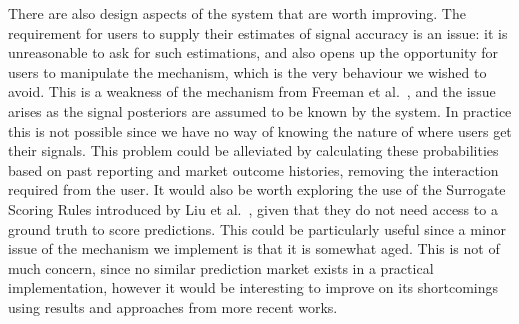 There are also design aspects of the system that are worth improving. The
requirement for users to supply their estimates of signal accuracy is an issue:
it is unreasonable to ask for such estimations, and also opens up the
opportunity for users to manipulate the mechanism, which is the very behaviour
we wished to avoid. This is a weakness of the mechanism from Freeman et
al.~\cite{CODiPM}, and the issue arises as the signal posteriors are assumed to
be known by the system. In practice this is not possible since we have no way
of knowing the nature of where users get their signals. This problem could be
alleviated by calculating these probabilities based on past reporting and
market outcome histories, removing the interaction required from the user. It
would also be worth exploring the use of the Surrogate Scoring Rules introduced
by Liu et al.~\cite{Liu2020}, given that they do not need access to a ground
truth to score predictions. This could be particularly useful since a minor
issue of the mechanism we implement is that it is somewhat aged. This is not of
much concern, since no similar prediction market exists in a practical
implementation, however it would be interesting to improve on its shortcomings
using results and approaches from more recent works.


